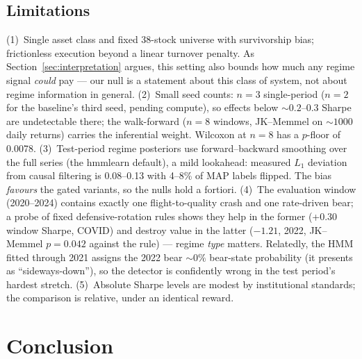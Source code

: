 \documentclass[sigconf,anonymous,review]{acmart}
\begin{document}
\subsection{Limitations}
(1)~Single asset class and fixed 38-stock universe with survivorship
bias; frictionless execution beyond a linear turnover penalty. As
Section~\ref{sec:interpretation} argues, this setting also bounds how
much any regime signal \emph{could} pay --- our null is a statement
about this class of system, not about regime information in general.
(2)~Small seed counts: $n{=}3$ single-period ($n{=}2$ for the
baseline's third seed, pending compute), so effects below
${\sim}0.2$--$0.3$ Sharpe are undetectable there; the walk-forward
($n{=}8$ windows, JK--Memmel on ${\sim}1000$ daily returns) carries the
inferential weight. Wilcoxon at $n{=}8$ has a $p$-floor of 0.0078.
(3)~Test-period regime posteriors use forward--backward smoothing over
the full series (the hmmlearn default), a mild lookahead: measured
$L_1$ deviation from causal filtering is 0.08--0.13 with 4--8\% of MAP
labels flipped. The bias \emph{favours} the gated variants, so the
nulls hold a fortiori.
(4)~The evaluation window (2020--2024) contains exactly one
flight-to-quality crash and one rate-driven bear; a probe of fixed
defensive-rotation rules shows they help in the former (+0.30
window Sharpe, COVID) and destroy value in the latter ($-1.21$, 2022,
JK--Memmel $p{=}0.042$ against the rule) --- regime \emph{type}
matters. Relatedly, the HMM fitted through 2021 assigns the 2022 bear
${\sim}0\%$ bear-state probability (it presents as ``sideways-down''),
so the detector is confidently wrong in the test period's hardest
stretch.
(5)~Absolute Sharpe levels are modest by institutional standards; the
comparison is relative, under an identical reward.

\section{Conclusion}
\end{document}
